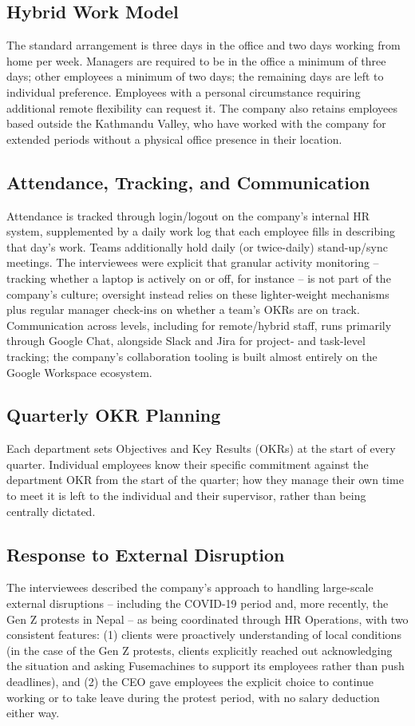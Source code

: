 \documentclass[12pt,a4paper]{report}
\begin{document}
\subsection*{Hybrid Work Model}
The standard arrangement is three days in the office and two days working from home per week. Managers are required to be in the office a minimum of three days; other employees a minimum of two days; the remaining days are left to individual preference. Employees with a personal circumstance requiring additional remote flexibility can request it. The company also retains employees based outside the Kathmandu Valley, who have worked with the company for extended periods without a physical office presence in their location.

\subsection*{Attendance, Tracking, and Communication}
Attendance is tracked through login/logout on the company's internal HR system, supplemented by a daily work log that each employee fills in describing that day's work. Teams additionally hold daily (or twice-daily) stand-up/sync meetings. The interviewees were explicit that granular activity monitoring -- tracking whether a laptop is actively on or off, for instance -- is not part of the company's culture; oversight instead relies on these lighter-weight mechanisms plus regular manager check-ins on whether a team's OKRs are on track. Communication across levels, including for remote/hybrid staff, runs primarily through Google Chat, alongside Slack and Jira for project- and task-level tracking; the company's collaboration tooling is built almost entirely on the Google Workspace ecosystem.

\subsection*{Quarterly OKR Planning}
Each department sets Objectives and Key Results (OKRs) at the start of every quarter. Individual employees know their specific commitment against the department OKR from the start of the quarter; how they manage their own time to meet it is left to the individual and their supervisor, rather than being centrally dictated.

\subsection*{Response to External Disruption}
The interviewees described the company's approach to handling large-scale external disruptions -- including the COVID-19 period and, more recently, the Gen Z protests in Nepal -- as being coordinated through HR Operations, with two consistent features: (1) clients were proactively understanding of local conditions (in the case of the Gen Z protests, clients explicitly reached out acknowledging the situation and asking Fusemachines to support its employees rather than push deadlines), and (2) the CEO gave employees the explicit choice to continue working or to take leave during the protest period, with no salary deduction either way.
\end{document}
